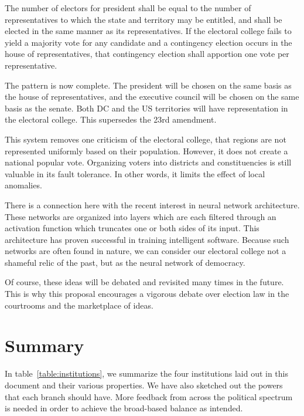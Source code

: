\documentclass{article}
\begin{document}
\begin{quoting}
The number of electors for president shall be equal to the number of representatives to which the state and territory may be entitled, and shall be elected in the same manner as its representatives. If the electoral college fails to yield a majority vote for any candidate and a contingency election occurs in the house of representatives, that contingency election shall apportion one vote per representative.
\end{quoting}

The pattern is now complete. The president will be chosen on the same basis as the house of representatives, and the executive council will be chosen on the same basis as the senate. Both DC and the US territories will have representation in the electoral college. This supersedes the 23rd amendment.

This system removes one criticism of the electoral college, that regions are not represented uniformly based on their population. However, it does not create a national popular vote. Organizing voters into districts and constituencies is still valuable in its fault tolerance. In other words, it limits the effect of local anomalies.

There is a connection here with the recent interest in neural network architecture. These networks are organized into layers which are each filtered through an activation function which truncates one or both sides of its input. This architecture has proven successful in training intelligent software. Because such networks are often found in nature, we can consider our electoral college not a shameful relic of the past, but as the neural network of democracy.

Of course, these ideas will be debated and revisited many times in the future. This is why this proposal encourages a vigorous debate over election law in the courtrooms and the marketplace of ideas.

\section{Summary}

In table~\ref{table:institutions}, we summarize the four institutions laid out in this document and their various properties. We have also sketched out the powers that each branch should have. More feedback from across the political spectrum is needed in order to achieve the broad-based balance as intended.
\end{document}
